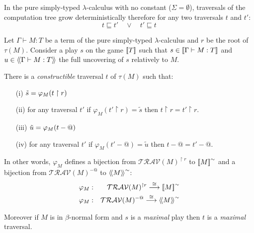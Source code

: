 \begin{lem}
\label{lem:determ_trav}
In the pure simply-typed $\lambda$-calculus with no constant ($\Sigma = \emptyset$), traversals of the computation tree grow
deterministically therefore for any two traversals $t$ and $t'$:
$$t \sqsubseteq t' \quad \vee \quad t' \sqsubseteq t$$
\end{lem}


\begin{prop}
\label{prop:rel_gamesem_redtrav_closed} Let $\Gamma \vdash M : T$ be
a term of the pure simply-typed $\lambda$-calculus and $r$ be
the root of $\tau(M)$.
Consider a play $s$ on the game ${[\![ T ]\!]}$ such that $s \in {[\![\Gamma \vdash M:T ]\!]}$
and $u \in {\langle\!\langle \Gamma \vdash M:T \rangle\!\rangle}$ the full uncovering of $s$ relatively to $M$.

There is a \emph{constructible} traversal $t$ of $\tau(M)$ such that:
\begin{itemize}
\item[(i)] $\tilde{s} =  \varphi_M (t \upharpoonright r ) $
\item[(ii)] for any traversal $t'$ if $\varphi_M (t' \upharpoonright r ) = \tilde{s}$ then $t\upharpoonright r = t'\upharpoonright r$.
\item[(iii)] $\tilde{u} =  \varphi_M (t - @)$
\item[(iv)] for any traversal $t'$ if $\varphi_M (t' - @ ) = \tilde{u}$ then $t-@ =t' -@$.
\end{itemize}


In other words, $\varphi_M$ defines a bijection from $\mathcal{TRAV}(M)^{\upharpoonright r}$ to ${[\![ M ]\!]}^\sim$ and
a bijection from $\mathcal{TRAV}(M)^{-@}$ to ${\langle\!\langle M \rangle\!\rangle}^\sim$:
\begin{eqnarray*}
 \varphi_M  &:& \mathcal{TRAV}(M)^{\upharpoonright r} \stackrel{\cong}{\longrightarrow} {[\![ M ]\!]}^\sim \\
 \varphi_M  &:& \mathcal{TRAV}(M)^{-@} \stackrel{\cong}{\longrightarrow} {\langle\!\langle M \rangle\!\rangle}^\sim
\end{eqnarray*}

Moreover if $M$ is in $\beta$-normal form and $s$ is a \emph{maximal} play then  $t$ is
a \emph{maximal} traversal.
\end{prop}


